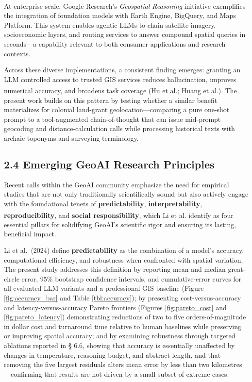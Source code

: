 \documentclass[
  10pt,
  twocolumn]{article}
\begin{document}
At enterprise scale, Google Research's \emph{Geospatial Reasoning}
initiative\textsuperscript{}
exemplifies the integration of foundation models with Earth Engine,
BigQuery, and Maps Platform. This system enables agentic LLMs to chain
satellite imagery, socioeconomic layers, and routing services to answer
compound spatial queries in seconds---a capability relevant to both
consumer applications and research contexts.

Across these diverse implementations, a consistent finding emerges:
granting an LLM controlled access to trusted GIS services reduces
hallucination, improves numerical accuracy, and broadens task coverage
(Hu et al.\textsuperscript{}; Huang
et al.\textsuperscript{}). The
present work builds on this pattern by testing whether a similar benefit
materializes for colonial land-grant geolocation---comparing a pure
one-shot prompt to a tool-augmented chain-of-thought that can issue
mid-prompt geocoding and distance-calculation calls while processing
historical texts with archaic toponyms and surveying terminology.

\subsection{2.4 Emerging GeoAI Research
Principles}\label{emerging-geoai-research-principles}

Recent calls within the GeoAI community emphasize the need for empirical
studies that are not only traditionally scientifically sound but also
actively engage with the foundational tenets of \textbf{predictability},
\textbf{interpretability}, \textbf{reproducibility}, and \textbf{social
responsibility}, which Li et
al.\textsuperscript{} identify as four
essential pillars for solidifying GeoAI's scientific rigor and ensuring
its lasting, beneficial impact.

Li et al.~(2024) define \textbf{predictability} as the combination of a
model's accuracy, computational efficiency, and robustness when
confronted with spatial variation. The present study addresses this
definition by reporting mean and median great-circle error, 95\%
bootstrap confidence intervals, and cumulative-error curves for all
evaluated LLM variants and a professional GIS baseline (Figure
\ref{fig:accuracy_bar} and Table \ref{tbl:accuracy}); by presenting
cost-versus-accuracy and latency-versus-accuracy Pareto frontiers
(Figures \ref{fig:pareto_cost} and \ref{fig:pareto_latency})
demonstrating reductions of two to five orders-of-magnitude in dollar
cost and turnaround time relative to human baselines while preserving or
improving spatial accuracy; and by examining robustness through targeted
ablations reported in § 6.6, showing that accuracy is essentially
unaffected by changes in temperature, reasoning-budget, and abstract
length, and that removing the five largest residuals alters mean error
by less than two kilometres---confirming that results are not driven by
a small subset of extreme cases.
\end{document}
